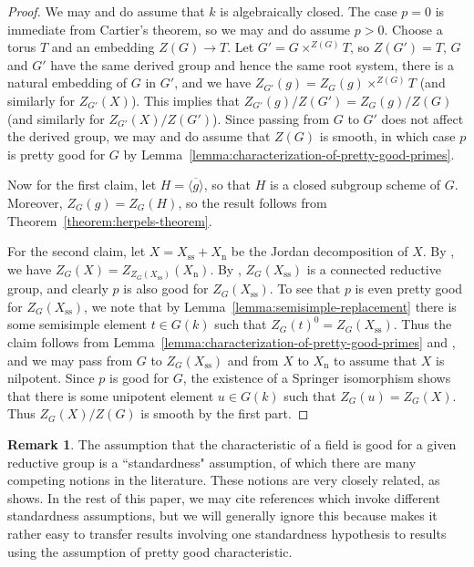 \documentclass[11pt,reqno]{amsart}
\theoremstyle{definition}
\newtheorem{remark}[theorem]{Remark}
\renewcommand{\rm}{\mathrm}
\begin{document}
\begin{proof}
We may and do assume that $k$ is algebraically closed. The case $p=0$ is immediate from Cartier's theorem, so we may and do assume $p > 0$. Choose a torus $T$ and an embedding $Z(G) \to T$. Let $G' = G \times^{Z(G)} T$, so $Z(G') = T$, $G$ and $G'$ have the same derived group and hence the same root system, there is a natural embedding of $G$ in $G'$, and we have $Z_{G'}(g) = Z_G(g) \times^{Z(G)} T$ (and similarly for $Z_{G'}(X)$). This implies that $Z_{G'}(g)/Z(G') = Z_G(g)/Z(G)$ (and similarly for $Z_{G'}(X)/Z(G')$). Since passing from $G$ to $G'$ does not affect the derived group, we may and do assume that $Z(G)$ is smooth, in which case $p$ is pretty good for $G$ by Lemma~\ref{lemma:characterization-of-pretty-good-primes}. \smallskip

Now for the first claim, let $H = \overline{\langle g \rangle}$, so that $H$ is a closed subgroup scheme of $G$. Moreover, $Z_G(g) = Z_G(H)$, so the result follows from Theorem~\ref{theorem:herpels-theorem}. \smallskip

For the second claim, let $X = X_{\rm{ss}} + X_{\rm{n}}$ be the Jordan decomposition of $X$. By \cite[Lem.\ 2.6]{Integral-Springer}, we have $Z_G(X) = Z_{Z_G(X_{\rm{ss}})}(X_{\rm{n}})$. By \cite[Prop.\ 3.7]{Integral-Springer}, $Z_G(X_{\rm{ss}})$ is a connected reductive group, and clearly $p$ is also good for $Z_G(X_{\rm{ss}})$. To see that $p$ is even pretty good for $Z_G(X_{\rm{ss}})$, we note that by Lemma~\ref{lemma:semisimple-replacement} there is some semisimple element $t \in G(k)$ such that $Z_G(t)^0 = Z_G(X_{\rm{ss}})$. Thus the claim follows from Lemma~\ref{lemma:characterization-of-pretty-good-primes} and \cite[Cor.\ 3.2]{Integral-Springer}, and we may pass from $G$ to $Z_G(X_{\rm{ss}})$ and from $X$ to $X_{\rm{n}}$ to assume that $X$ is nilpotent. Since $p$ is good for $G$, the existence of a Springer isomorphism \cite[Thm.\ 5.1]{Integral-Springer} shows that there is some unipotent element $u \in G(k)$ such that $Z_G(u) = Z_G(X)$. Thus $Z_G(X)/Z(G)$ is smooth by the first part.
\end{proof}

\begin{remark}
The assumption that the characteristic of a field is good for a given reductive group is a ``standardness" assumption, of which there are many competing notions in the literature. These notions are very closely related, as \cite[Thm.\ 5.2]{Herpel} shows. In the rest of this paper, we may cite references which invoke different standardness assumptions, but we will generally ignore this because \cite[Thm.\ 5.2]{Herpel} makes it rather easy to transfer results involving one standardness hypothesis to results using the assumption of pretty good characteristic.
\end{remark}
\end{document}
